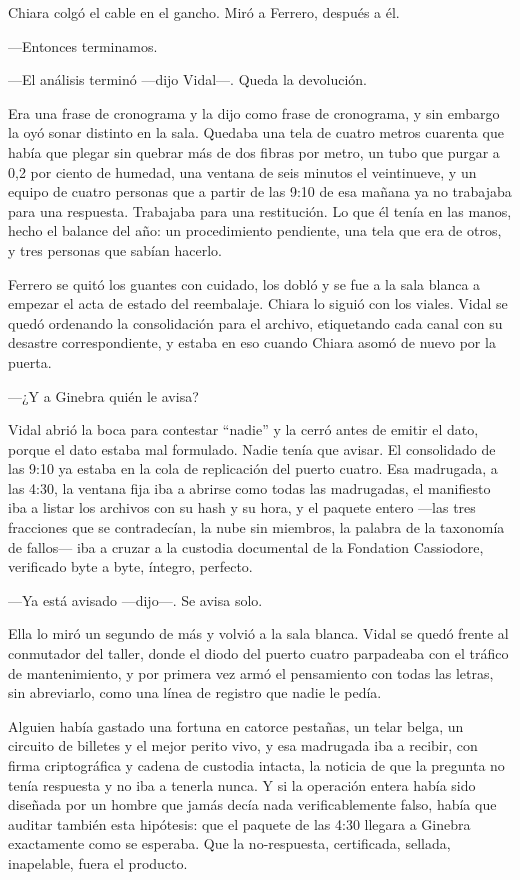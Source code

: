 Chiara colgó el cable en el gancho. Miró a Ferrero, después a él.

---Entonces terminamos.

---El análisis terminó ---dijo Vidal---. Queda la devolución.

Era una frase de cronograma y la dijo como frase de cronograma, y sin embargo la oyó sonar distinto en la sala. Quedaba una tela de cuatro metros cuarenta que había que plegar sin quebrar más de dos fibras por metro, un tubo que purgar a 0,2 por ciento de humedad, una ventana de seis minutos el veintinueve, y un equipo de cuatro personas que a partir de las 9:10 de esa mañana ya no trabajaba para una respuesta. Trabajaba para una restitución. Lo que él tenía en las manos, hecho el balance del año: un procedimiento pendiente, una tela que era de otros, y tres personas que sabían hacerlo.

Ferrero se quitó los guantes con cuidado, los dobló y se fue a la sala blanca a empezar el acta de estado del reembalaje. Chiara lo siguió con los viales. Vidal se quedó ordenando la consolidación para el archivo, etiquetando cada canal con su desastre correspondiente, y estaba en eso cuando Chiara asomó de nuevo por la puerta.

---¿Y a Ginebra quién le avisa?

Vidal abrió la boca para contestar ``nadie'' y la cerró antes de emitir el dato, porque el dato estaba mal formulado. Nadie tenía que avisar. El consolidado de las 9:10 ya estaba en la cola de replicación del puerto cuatro. Esa madrugada, a las 4:30, la ventana fija iba a abrirse como todas las madrugadas, el manifiesto iba a listar los archivos con su hash y su hora, y el paquete entero ---las tres fracciones que se contradecían, la nube sin miembros, la palabra de la taxonomía de fallos--- iba a cruzar a la custodia documental de la Fondation Cassiodore, verificado byte a byte, íntegro, perfecto.

---Ya está avisado ---dijo---. Se avisa solo.

Ella lo miró un segundo de más y volvió a la sala blanca. Vidal se quedó frente al conmutador del taller, donde el diodo del puerto cuatro parpadeaba con el tráfico de mantenimiento, y por primera vez armó el pensamiento con todas las letras, sin abreviarlo, como una línea de registro que nadie le pedía.

Alguien había gastado una fortuna en catorce pestañas, un telar belga, un circuito de billetes y el mejor perito vivo, y esa madrugada iba a recibir, con firma criptográfica y cadena de custodia intacta, la noticia de que la pregunta no tenía respuesta y no iba a tenerla nunca. Y si la operación entera había sido diseñada por un hombre que jamás decía nada verificablemente falso, había que auditar también esta hipótesis: que el paquete de las 4:30 llegara a Ginebra exactamente como se esperaba. Que la no-respuesta, certificada, sellada, inapelable, fuera el producto.


